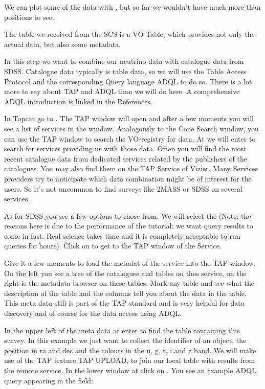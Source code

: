 \documentclass[twoside]{article}[12pt]
\begin{document}
\UCD

We can
plot some of the data with , but so far we wouldn't have
much more than positions to see. 

The table we received from the SCS is a VO-Table, which provides not
only the actual data, but also some metadata. 


In this step we want to combine our neutrino data with catalogue data
from SDSS. Catalogue data typically is table data, so we will use the
Table Access Protocol and the corresponding Query language ADQL to do
so. There is a lot more to say about TAP and ADQL than we will do here.
A comprehensive ADQL introduction is linked in the References. 

In Topcat go to  \goto{}. The TAP window will open and
after a few moments you will see a list of services in the window.
Analogously to the Cone Search window, you can use the TAP window to
search the VO-registry for data. At  we will enter
 to search for services providing us with those data. Often
you will find the most recent catalogue data from dedicated services
related by the publishers of the catalogues. You may also find them on
the TAP Service of Vizier. Many Services providers try to anticipate
which data combination might be of interest for the users. So it's not
uncommon to find surveys like 2MASS or SDSS on several services. 
\TAPSTD

As for SDSS you see a few options to chose from. We will select the
 (Note: the reasons here is due to the performance
of the tutorial: we want query results to come in fast. Real science
takes time and it is completely acceptable to run queries for hours).
Click on  to get to the TAP window of the Service. 

Give it a few moments to load the metadat of the service into the TAP
window. On the left you see a tree of the catalogues and tables on thes
service, on the right is the metadata browser on these tables. Mark any
table and see what the description of the table and the columns tell you
about the data in the table. This meta data still is part of the TAP
standard and is very helpful for data discovery and of course for the
data access using ADQL. 

In the upper left of the meta data at  enter  to
find the table containing this survey. In this example we just want to
collect the identifier of an object, the position in ra and dec and the
colours in the u, g, r, i and z band. We will make use of the TAP
feature TAP UPLOAD, to join our local table with results from the remote
service. In the lower window at 
click on  \goto {} \goto{}. You see an example
ADQL query appearing in the field:
\end{document}
